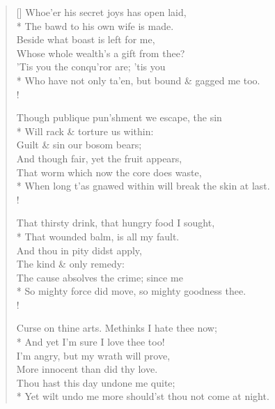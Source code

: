 \documentclass[MAIN]{subfiles}
\begin{document}
\begin{verse}[\versewidth]
\vin Whoe'er his secret joys has open laid,\\*
\vin \vin The bawd to his own wife is made.\\
\vin Beside what boast is left for me,\\
\vin Whose whole wealth's a gift from thee?\\
\vin \vin 'Tis you the conqu'ror are; 'tis you\\*
Who have not only ta'en, but bound \& gagged me too.\\!

\vin Though publique pun'shment we escape, the sin\\*
\vin \vin Will rack \& torture us within:\\
\vin Guilt \& sin our bosom bears;\\
\vin And though fair, yet the fruit appears,\\
\vin \vin That worm which now the core does waste,\\*
When long t'as gnawed within will break the skin at last.\\!

\vin That thirsty drink, that hungry food I sought,\\*
\vin \vin That wounded balm, is all my fault.\\
\vin And thou in pity didst apply,\\
\vin The kind \& only remedy:\\
\vin \vin The cause absolves the crime; since me\\*
So mighty force did move, so mighty goodness thee.\\!

\vin Curse on thine arts. Methinks I hate thee now;\\*
\vin \vin And yet I'm sure I love thee too!\\
\vin I'm angry, but my wrath will prove,\\
\vin More innocent than did thy love.\\
\vin \vin Thou hast this day undone me quite;\\*
Yet wilt undo me more should'st thou not come at night.
\end{verse}
\end{document}
